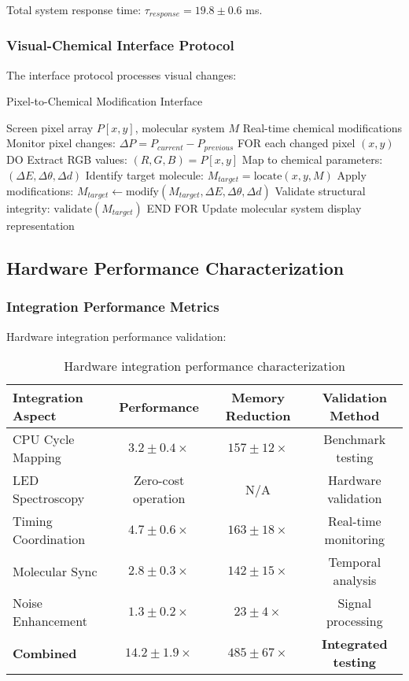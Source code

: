 Total system response time: $\tau_{response} = 19.8 \pm 0.6$ ms.

\subsubsection{Visual-Chemical Interface Protocol}

The interface protocol processes visual changes:

\begin{algorithm}[H]
\caption{Pixel-to-Chemical Modification Interface}
\begin{algorithmic}[1]
\REQUIRE Screen pixel array $P[x,y]$, molecular system $M$
\ENSURE Real-time chemical modifications
\STATE Monitor pixel changes: $\Delta P = P_{current} - P_{previous}$
\STATE FOR each changed pixel $(x,y)$ DO
\STATE \quad Extract RGB values: $(R, G, B) = P[x,y]$
\STATE \quad Map to chemical parameters: $(\Delta E, \Delta \theta, \Delta d)$
\STATE \quad Identify target molecule: $M_{target} = \text{locate}(x, y, M)$
\STATE \quad Apply modifications: $M_{target} \leftarrow \text{modify}(M_{target}, \Delta E, \Delta \theta, \Delta d)$
\STATE \quad Validate structural integrity: $\text{validate}(M_{target})$
\STATE END FOR
\STATE Update molecular system display representation
\end{algorithmic}
\end{algorithm}

\subsection{Hardware Performance Characterization}

\subsubsection{Integration Performance Metrics}

Hardware integration performance validation:

\begin{table}[H]
\centering
\begin{tabular}{|l|c|c|c|}
\hline
\textbf{Integration Aspect} & \textbf{Performance} & \textbf{Memory Reduction} & \textbf{Validation Method} \\
\hline
CPU Cycle Mapping & $3.2 \pm 0.4 \times$ & $157 \pm 12 \times$ & Benchmark testing \\
LED Spectroscopy & Zero-cost operation & N/A & Hardware validation \\
Timing Coordination & $4.7 \pm 0.6 \times$ & $163 \pm 18 \times$ & Real-time monitoring \\
Molecular Sync & $2.8 \pm 0.3 \times$ & $142 \pm 15 \times$ & Temporal analysis \\
Noise Enhancement & $1.3 \pm 0.2 \times$ & $23 \pm 4 \times$ & Signal processing \\
\hline
\textbf{Combined} & \textbf{$14.2 \pm 1.9 \times$} & \textbf{$485 \pm 67 \times$} & \textbf{Integrated testing} \\
\hline
\end{tabular}
\caption{Hardware integration performance characterization}
\end{table}

